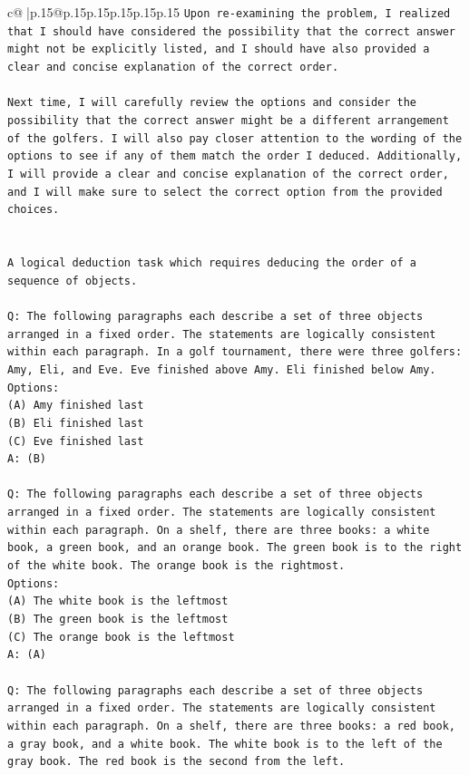 \documentclass{article}
\begin{document}
{\begin{supertabular}{c@{$\;$}|p{.15\linewidth}@{}p{.15\linewidth}p{.15\linewidth}p{.15\linewidth}p{.15\linewidth}p{.15\linewidth}}
{{{\texttt{Upon re{-}examining the problem, I realized that I should have considered the possibility that the correct answer might not be explicitly listed, and I should have also provided a clear and concise explanation of the correct order. } \\
\\ 
\texttt{Next time, I will carefully review the options and consider the possibility that the correct answer might be a different arrangement of the golfers. I will also pay closer attention to the wording of the options to see if any of them match the order I deduced. Additionally, I will provide a clear and concise explanation of the correct order, and I will make sure to select the correct option from the provided choices.} \\
\\ 
\\ 
\texttt{A logical deduction task which requires deducing the order of a sequence of objects.} \\
\\ 
\texttt{Q: The following paragraphs each describe a set of three objects arranged in a fixed order. The statements are logically consistent within each paragraph. In a golf tournament, there were three golfers: Amy, Eli, and Eve. Eve finished above Amy. Eli finished below Amy.} \\
\texttt{Options:} \\
\texttt{(A) Amy finished last} \\
\texttt{(B) Eli finished last} \\
\texttt{(C) Eve finished last} \\
\texttt{A: (B)} \\
\\ 
\texttt{Q: The following paragraphs each describe a set of three objects arranged in a fixed order. The statements are logically consistent within each paragraph. On a shelf, there are three books: a white book, a green book, and an orange book. The green book is to the right of the white book. The orange book is the rightmost.} \\
\texttt{Options:} \\
\texttt{(A) The white book is the leftmost} \\
\texttt{(B) The green book is the leftmost} \\
\texttt{(C) The orange book is the leftmost} \\
\texttt{A: (A)} \\
\\ 
\texttt{Q: The following paragraphs each describe a set of three objects arranged in a fixed order. The statements are logically consistent within each paragraph. On a shelf, there are three books: a red book, a gray book, and a white book. The white book is to the left of the gray book. The red book is the second from the left.} \\
}}}
\end{supertabular}}
\end{document}
